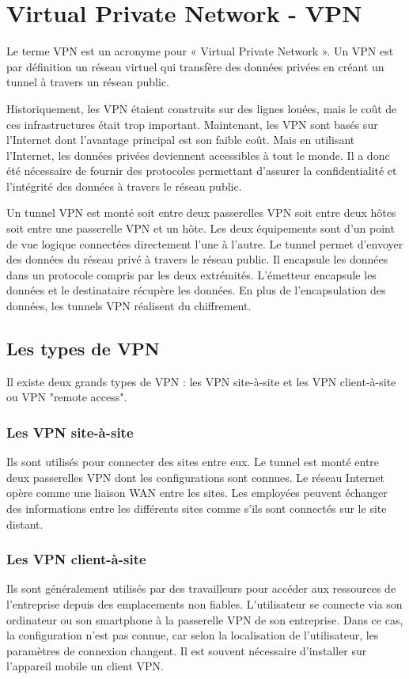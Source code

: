 \section{Virtual Private Network - VPN}
Le terme VPN est un acronyme pour « Virtual Private Network ».
Un VPN est par définition un réseau virtuel qui transfère des données privées en créant un tunnel à travers un réseau public.

Historiquement, les VPN étaient construits sur des lignes louées, mais le coût de ces infrastructures était trop important.
Maintenant, les VPN sont basés sur l'Internet dont l'avantage principal est son faible coût.
Mais en utilisant l'Internet, les données privées deviennent accessibles à tout le monde. 
Il a donc été nécessaire de fournir des protocoles permettant d'assurer la confidentialité et l'intégrité des données à travers le réseau public. 

Un tunnel VPN est monté soit entre deux passerelles VPN soit entre deux hôtes soit entre une passerelle VPN et un hôte. 
Les deux équipements sont d'un point de vue logique connectées directement l'une à l'autre. 
Le tunnel permet d'envoyer des données du réseau privé à travers le réseau public.
Il encapsule les données dans un protocole compris par les deux extrémités. 
L'émetteur encapsule les données et le destinataire récupère les données. 
En plus de l'encapsulation des données, les tunnels VPN réalisent du chiffrement. 

\subsection{Les types de VPN}
Il existe deux grands types de VPN : les VPN site-à-site et les VPN client-à-site ou VPN "remote access".

\subsubsection{Les VPN site-à-site} 
Ils sont utilisés pour connecter des sites entre eux. 
Le tunnel est monté entre deux passerelles VPN dont les configurations sont connues. 
Le réseau Internet opère comme une liaison WAN entre les sites. 
Les employées peuvent échanger des informations entre les différents sites comme s'ils sont connectés sur le site distant. 

\subsubsection{Les VPN client-à-site} 
Ils sont généralement utilisés par des travailleurs pour accéder aux ressources de l'entreprise depuis des emplacements non fiables.  
L'utilisateur se connecte via son ordinateur ou son smartphone à la passerelle VPN de son entreprise.  
Dans ce cas, la configuration n'est pas connue, car selon la localisation de l'utilisateur, les paramètres de connexion changent.  
Il est souvent nécessaire d'installer sur l'appareil mobile un client VPN. 

